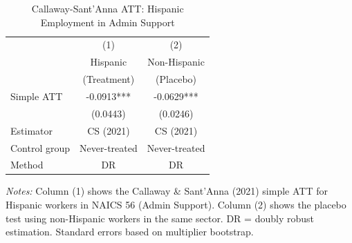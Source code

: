\begin{table}[htbp]
\centering
\caption{Callaway-Sant'Anna ATT: Hispanic Employment in Admin Support}
\label{tab:cs}
\begin{tabular}{lcc}
\hline\hline
 & (1) & (2) \\
 & Hispanic & Non-Hispanic \\
 & (Treatment) & (Placebo) \\
\hline
Simple ATT & -0.0913*** & -0.0629*** \\
 & (0.0443) & (0.0246) \\
\hline
Estimator & CS (2021) & CS (2021) \\
Control group & Never-treated & Never-treated \\
Method & DR & DR \\
\hline\hline
\end{tabular}
\begin{tablenotes}[flushleft]
\small
\item \textit{Notes:} Column (1) shows the Callaway \& Sant'Anna (2021) simple ATT for Hispanic workers in NAICS 56 (Admin Support). Column (2) shows the placebo test using non-Hispanic workers in the same sector. DR = doubly robust estimation. Standard errors based on multiplier bootstrap.
\end{tablenotes}
\end{table}
